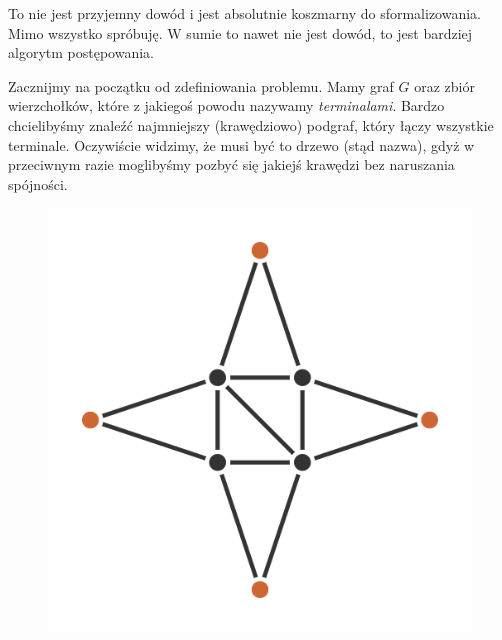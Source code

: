  To nie jest przyjemny dowód i jest absolutnie koszmarny do sformalizowania. Mimo wszystko spróbuję. W sumie to nawet nie jest dowód, to jest bardziej algorytm postępowania. 
      
    Zacznijmy na początku od zdefiniowania problemu.
    Mamy graf $G$ oraz zbiór wierzchołków, które z jakiegoś powodu nazywamy 
    \textit{terminalami}.
    Bardzo chcielibyśmy znaleźć najmniejszy (krawędziowo) podgraf, który łączy wszystkie terminale.
    Oczywiście widzimy, że musi być to drzewo (stąd nazwa), gdyż w przeciwnym razie moglibyśmy pozbyć się jakiejś krawędzi bez naruszania spójności.
    
    \begin{figure}[H]
        \centering
\includegraphics[scale=0.4]{chapters/dyskretna/inclusion-exclusion/img/steiner_problem_example.png}

\end{figure}
